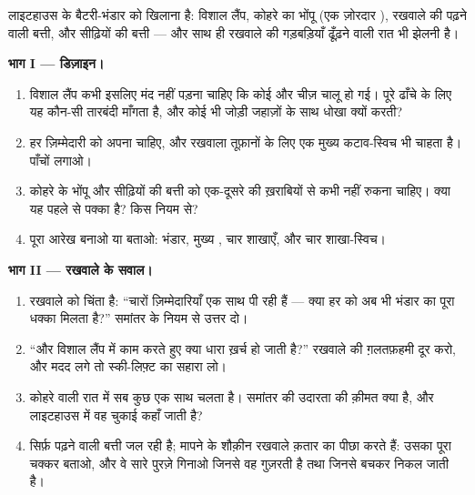 \begin{problem}\label{pb:g7:circuits-series-parallel:1}
लाइटहाउस के बैटरी-भंडार को खिलाना है: विशाल लैंप, कोहरे का भोंपू (एक
ज़ोरदार ), रखवाले की पढ़ने वाली बत्ती, और सीढ़ियों की बत्ती ---
और साथ ही रखवाले की गड़बड़ियाँ ढूँढ़ने वाली रात भी झेलनी है।

\medskip\noindent\textbf{भाग I --- डिज़ाइन।}
\begin{enumerate}
  \item विशाल लैंप कभी इसलिए मंद नहीं पड़ना चाहिए कि कोई और चीज़ चालू
        हो गई। पूरे ढाँचे के लिए यह कौन-सी तारबंदी माँगता है, और
         कोई भी जोड़ी जहाज़ों के साथ धोखा क्यों करती?
  \item हर ज़िम्मेदारी को अपना  चाहिए, और रखवाला तूफ़ानों के लिए
        एक मुख्य कटाव-स्विच भी चाहता है। पाँचों  लगाओ।
  \item कोहरे के भोंपू और सीढ़ियों की बत्ती को एक-दूसरे की ख़राबियों
        से कभी नहीं रुकना चाहिए। क्या यह पहले से पक्का है? किस नियम
        से?
  \item पूरा आरेख बनाओ या बताओ: भंडार, मुख्य , चार शाखाएँ, और
        चार शाखा-स्विच।
\end{enumerate}

\medskip\noindent\textbf{भाग II --- रखवाले के सवाल।}
\begin{enumerate}[resume]
  \item रखवाले को चिंता है: ``चारों ज़िम्मेदारियाँ एक साथ पी रही हैं
        --- क्या हर  को अब भी भंडार का पूरा धक्का मिलता है?''
        समांतर के नियम से उत्तर दो।
  \item ``और विशाल लैंप में काम करते हुए क्या धारा ख़र्च हो जाती
        है?'' रखवाले की ग़लतफ़हमी दूर करो, और मदद लगे तो स्की-लिफ़्ट
        का सहारा लो।
  \item कोहरे वाली रात में सब कुछ एक साथ चलता है। समांतर की उदारता की
        क़ीमत क्या है, और लाइटहाउस में वह चुकाई कहाँ जाती है?
  \item सिर्फ़ पढ़ने वाली बत्ती जल रही है; मापने के शौक़ीन रखवाले
        क़तार का पीछा करते हैं: उसका पूरा चक्कर बताओ, और वे सारे
        पुरज़े गिनाओ जिनसे वह गुज़रती है तथा जिनसे बचकर निकल जाती है।
\end{enumerate}


\end{problem}
